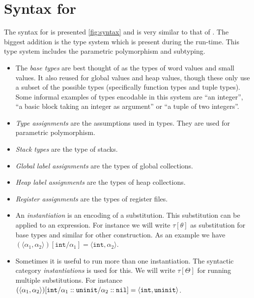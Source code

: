 \section{Syntax for \ATAL}

The syntax for \ATAL is presented \cref{fig:syntax} and is very similar to that
of \ATALe. The biggest addition is the type system which is present during the
run-time. This type system includes the parametric polymorphism and subtyping.


\begin{itemize}
\item The \emph{base types} are best thought of as the types of word values and
  small values. It also reused for global values and heap values, though these
  only use a subset of the possible types (specifically function types and tuple
  types). Some informal examples of types encodable in this system are ``an
  integer'', ``a basic block taking an integer as argument'' or ``a tuple of two
  integers''. 
\item \emph{Type assignments} are the assumptions used in types. They are used
  for parametric polymorphism.
\item \emph{Stack types} are the type of stacks.
\item \emph{Global label assignments} are the types of global collections.
\item \emph{Heap label assignments} are the types of heap collections.
\item \emph{Register assignments} are the types of register files.
\item An \emph{instantiation} is an encoding of a substitution. This substitution can
  be applied to an expression. For instance we will write $\tau[\theta]$ as
  substitution for base types and similar for other construction. As an example
  we have
  $(\langle \alpha_1, \alpha_2 \rangle)[\mathtt{int} / \alpha_1] = \langle
  \mathtt{int}, \alpha_2 \rangle$.
\item Sometimes it is useful to run more than one instantiation. The syntactic
  category \emph{instantiations} is used for this. We will write $\tau[\Theta]$
  for running multiple substitutions.  For instance
  $(\langle \alpha_1, \alpha_2 \rangle)[\mathtt{int} / \alpha_1 :: \mathtt{uninit} /
  \alpha_2 :: \mathtt{nil}] = \langle \mathtt{int}, \mathtt{uninit} \rangle$.
\end{itemize}

